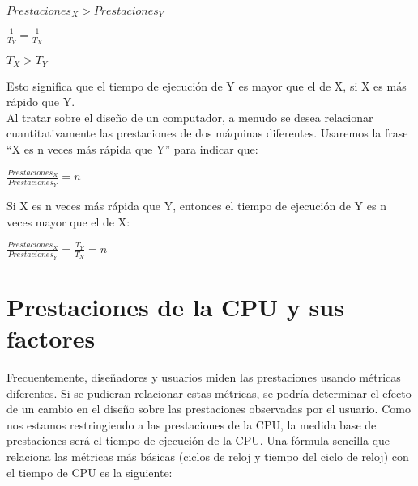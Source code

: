 \documentclass[12pt]{article}
\begin{document}
    \begin{spacing}{3.0} %
        \begin{center}  
            $Prestaciones_X > Prestaciones_Y$

            $\displaystyle\frac{1}{T_Y}=\frac{1}{T_X}$

            $T_X > T_Y$
        \end{center}
    \end{spacing}

    Esto significa que el tiempo de ejecución de Y es mayor que el de X, si X es más
     rápido que Y.\\
 Al tratar sobre el diseño de un computador, a menudo se desea relacionar
 cuantitativamente las prestaciones de dos máquinas diferentes. Usaremos la frase
 “X es n veces más rápida que Y” para indicar que:\\

 \begin{spacing}{3.0} 
        \begin{center}  
            $\displaystyle\frac{Prestaciones_X}{Prestaciones_Y}=n$\\
        \end{center}
    \end{spacing}

     Si X es n veces más rápida que Y, entonces el tiempo de ejecución de Y es n veces
 mayor que el de X:
 \begin{spacing}{3.0} %
        \begin{center}  
            $\displaystyle\frac{Prestaciones_X}{Prestaciones_Y}=\frac{T_Y}{T_X}=n$\\
        \end{center}
    \end{spacing}

    \section{ Prestaciones de la CPU y sus factores}
    Frecuentemente, diseñadores y usuarios miden las prestaciones usando métricas
 diferentes. Si se pudieran relacionar estas métricas, se podría determinar el efecto
 de un cambio en el diseño sobre las prestaciones observadas por el usuario. Como
 nos estamos restringiendo a las prestaciones de la CPU, la medida base de prestaciones
  será el tiempo de ejecución de la CPU. Una fórmula sencilla que relaciona
 las métricas más básicas (ciclos de reloj y tiempo del ciclo de reloj) con el tiempo
 de CPU es la siguiente:
\end{document}
